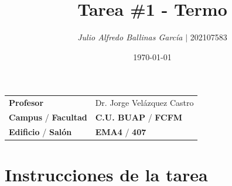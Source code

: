 \documentclass{article}
\title{\textcolor{Apple Green}{\textbf{Tarea}} \textcolor{Sun}{\textbf{\#}}\textcolor{Cinnabar}{\textbf{1}} - \textbf{Termo}}
\author{\emph{Julio Alfredo Ballinas García} $\boldsymbol{\mid}$ 202107583}
\date{\today}
\begin{document}
\maketitle



\begin{mybox}
\noindent\begin{tabular}{@{}ll}
	{\bfseries{Profesor}} & Dr. Jorge Velázquez Castro\\
	\textcolor{prussianblue}{\bfseries{Campus}} / \textcolor{trueblue}{\bfseries{Facultad}}  & \textcolor{prussianblue}{\bfseries{C.U. BUAP}} /  \textcolor{trueblue}{\bfseries{FCFM}} \\
	\textcolor{prussianblue}{\bfseries{Edificio}} /  \textcolor{trueblue}{\bfseries{Salón}}    & 	\textcolor{prussianblue}{\bfseries{EMA4}} /  \textcolor{trueblue}{\bfseries{407}}   
\end{tabular} 
\end{mybox} \vspace{1cm}

\section{Instrucciones de la tarea}
\end{document}
